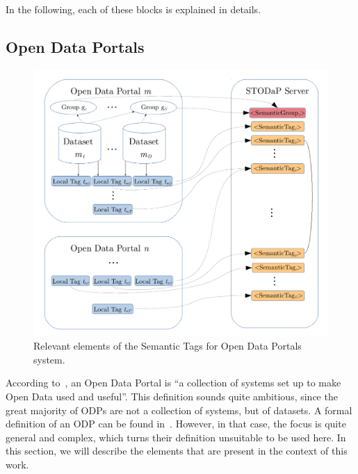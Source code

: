 In the following, each of these blocks is explained in details.

\subsection{Open Data Portals}
\label{sec:definition} 

\begin{figure}[t]
\begin{center}
\includegraphics[width=\columnwidth]{images/odp_definition.pdf}
\caption{Relevant elements of the Semantic Tags for Open Data Portals system.}
\label{fig:definition}
\end{center}
\end{figure}

According to~, an Open Data Portal is ``a collection of systems set up to make Open Data used and useful''.
This definition sounds quite ambitious, since the great majority of ODPs are not a collection of systems, but of datasets.
A formal definition of an ODP can be found in~.
However, in that case, the focus is quite general and complex, which turns their definition unsuitable to be used here. 
In this section, we will describe the elements that are present in the context of this work.

